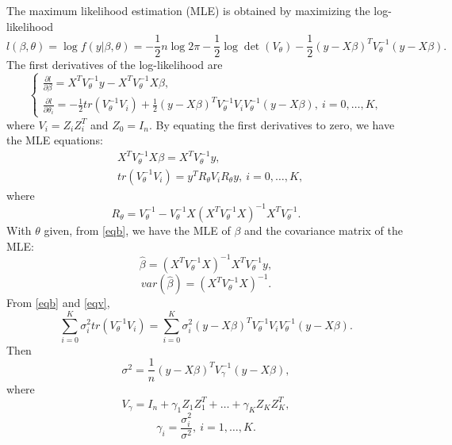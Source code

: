 \documentclass[
]{article}
\begin{document}
The maximum likelihood estimation (MLE) is obtained by maximizing the
log-likelihood \begin{equation}\label{logl}
l(\beta, \theta) = \log f(y|\beta,\theta) = -\frac{1}{2}n\log 2\pi - \frac{1}{2}\log\det(V_{\theta}) - \frac{1}{2}(y-X\beta)^TV_{\theta} ^{-1}(y-X\beta).
\end{equation} The first derivatives of the log-likelihood are
\begin{equation}\label{mleS} 
\left\{
\begin{array}{l}
\frac{\partial l}{\partial\beta} = X^TV_{\theta}^{-1}y - X^TV_{\theta}^{-1}X\beta,\\
\frac{\partial l}{\partial\theta_i} = -\frac{1}{2}tr(V_{\theta}^{-1}V_i) + \frac{1}{2}(y-X\beta)^TV_{\theta} ^{-1}V_iV_{\theta} ^{-1}(y-X\beta), ~i=0, \ldots, K,
\end{array} \right.
\end{equation} where \(V_i = Z_iZ_i^T\) and \(Z_0 = I_n\). By equating
the first derivatives to zero, we have the MLE equations: \begin{align} 
&X^TV_{\theta} ^{-1}X\beta = X^TV_{\theta}^{-1}y,\label{eqb}\\
&tr(V_{\theta}^{-1}V_i) = y^TR_{\theta}V_iR_{\theta}y, ~i = 0,\ldots, K,\label{eqv}
\end{align} where \[
R_{\theta} = V_{\theta}^{-1} - V_{\theta}^{-1}X(X^TV_{\theta}^{-1}X)^{-1}X^TV_{\theta}^{-1}.
\] With \(\theta\) given, from \eqref{eqb}, we have the MLE of \(\beta\)
and the covariance matrix of the MLE: \begin{equation}\label{mleb}
\hat\beta = (X^TV_{\theta}^{-1}X )^{-1}X^TV_{\theta}^{-1}y,
\end{equation} \[
var(\hat\beta) = (X^TV_{\theta}^{-1}X)^{-1}.
\] From \eqref{eqb} and \eqref{eqv}, \[
\sum_{i=0}^K \sigma^2_i tr(V_{\theta}^{-1}V_i) = \sum_{i=0}^K \sigma^2_i (y-X\beta)^TV_{\theta} ^{-1}V_iV_{\theta} ^{-1}(y-X\beta).
\] Then \[
\sigma^2 = \frac{1}{n}(y-X\beta)^TV_{\gamma} ^{-1}(y-X\beta),
\] where \[
V_{\gamma} = I_n + \gamma_1 Z_1Z_1^T + \ldots + \gamma_K Z_KZ_K^T,
\] \[
\gamma_i = \frac{\sigma^2_i}{\sigma^2}, ~i = 1, \ldots, K.
\]
\end{document}
